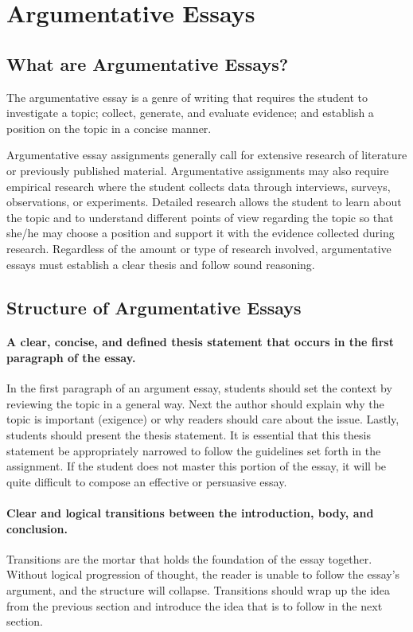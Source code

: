 \chapter{Argumentative Essays}

\section{What are Argumentative Essays?}
	The argumentative essay is a genre of writing that requires the student to investigate a topic; collect, generate, and evaluate evidence; and establish a position on the topic in a concise manner.
	
	Argumentative essay assignments generally call for extensive research of literature or previously published material. Argumentative assignments may also require empirical research where the student collects data through interviews, surveys, observations, or experiments. Detailed research allows the student to learn about the topic and to understand different points of view regarding the topic so that she/he may choose a position and support it with the evidence collected during research. Regardless of the amount or type of research involved, argumentative essays must establish a clear thesis and follow sound reasoning.
	
\section{Structure of Argumentative Essays}
	\subsubsection{A clear, concise, and defined thesis statement that occurs in the first paragraph of the essay.}
		In the first paragraph of an argument essay, students should set the context by reviewing the topic in a general way. Next the author should explain why the topic is important (exigence) or why readers should care about the issue. Lastly, students should present the thesis statement. It is essential that this thesis statement be appropriately narrowed to follow the guidelines set forth in the assignment. If the student does not master this portion of the essay, it will be quite difficult to compose an effective or persuasive essay.
	
	\subsubsection{Clear and logical transitions between the introduction, body, and conclusion.}
		Transitions are the mortar that holds the foundation of the essay together. Without logical progression of thought, the reader is unable to follow the essay’s argument, and the structure will collapse. Transitions should wrap up the idea from the previous section and introduce the idea that is to follow in the next section.
	
